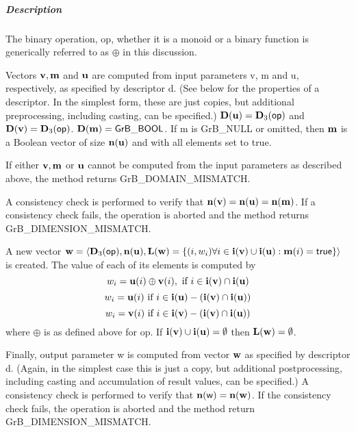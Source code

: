 \subparagraph{Description}


The binary operation, {\sf op}, whether it is a monoid or a binary function
is generically referred to as $\oplus$ in this discussion.

Vectors ${\bf v}, {\bf m}$ and ${\bf u}$ are computed from
input parameters {\sf v}, {\sf m} and {\sf u}, respectively, as specified
by descriptor {\sf d}. (See below for the properties of a descriptor. In
the simplest form, these are just copies, but additional preprocessing,
including casting, can be specified.)  $\bold{D}({\bf u}) =
\bold{D}_3({\sf op})$ and $\bold{D}({\bf v}) = \bold{D}_3({\sf op})$.
$\bold{D}({\bf m}) = {\sf GrB\_BOOL}$.  If {\sf m} is {\sf GrB\_NULL} or omitted,
then ${\bf m}$ is a Boolean vector of size $\bold{n}({\bf u})$
and with all elements set to {\sf true}.

If either ${\bf v}, {\bf m}$ or ${\bf u}$ cannot be computed
from the input parameters as described above, the method returns {\sf
GrB\_DOMAIN\_MISMATCH}.

A consistency check is performed to verify that $\bold{n}({\bf v})
= \bold{n}({\bf u}) = \bold{n}({\bf m})$. If a consistency check fails, the operation is
aborted and the method returns {\sf GrB\_DIMENSION\_MISMATCH}.

A new vector ${\bf w} = \langle \bold{D}_3({\sf op}),
\bold{n}({\bf u}), \bold{L}({\bf w}) = \{(i,w_i)  \forall i \in
{\bf i}({\bf v}) \cup {\bf i}({\bf u}) : {\bf m}(i)
= {\sf true} \} \rangle$ is created.  The value of each of its
elements is computed by 
\[
w_i = {\bf u}(i) \oplus {\bf v}(i), \ \mbox{if}\  i \in  {\bf i}({\bf v}) \cap {\bf i}({\bf u})
\]
\[
w_i = {\bf u}(i) \ \mbox{if}\  i \in  {\bf i}({\bf u}) - ({\bf i}({\bf v}) \cap {\bf i}({\bf u}))
\]
\[
w_i = {\bf v}(i) \ \mbox{if}\  i \in  {\bf i}({\bf v}) - ({\bf i}({\bf v}) \cap {\bf i}({\bf u}))
\]
where $\oplus$ is as defined above for {\sf op}.
If ${\bf i}({\bf v}) \cup {\bf i}({\bf u}) = \emptyset$
then $\bold{L}({\bf w}) = \emptyset$.

Finally, output parameter {\sf w} is computed from vector ${\bf w}$
as specified by descriptor {\sf d}. (Again, in the simplest case this
is just a copy, but additional postprocessing, including casting and
accumulation of result values, can be specified.)  A consistency check is
performed to verify that $\bold{n}({\sf w}) = \bold{n}({\bf w})$. If
the consistency check fails, the operation is aborted and the method
return {\sf GrB\_DIMENSION\_MISMATCH}.


